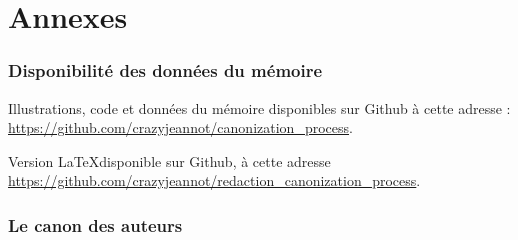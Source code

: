 \appendix
\part*{Annexes}
\pagestyle{myheadings}

\section{Disponibilité des données du mémoire}\label{code}

Illustrations, code et données du mémoire disponibles sur Github à cette adresse : \url{https://github.com/crazyjeannot/canonization_process}. 

Version \LaTeX disponible sur Github, à cette adresse \url{https://github.com/crazyjeannot/redaction_canonization_process}.


\newpage
\section{Le canon des auteurs}\label{canon_auteur}

